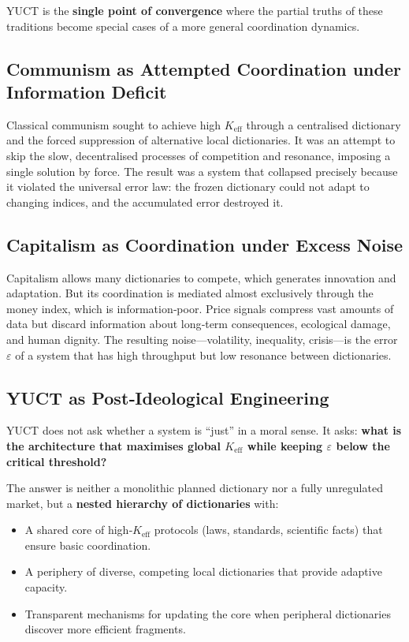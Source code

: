 \documentclass[12pt,a4paper]{article}
\newcommand{\Keff}{K_{\mathrm{eff}}}
\begin{document}
	YUCT is the \textbf{single point of convergence} where the partial truths of these traditions become special cases of a more general coordination dynamics.
	
	\subsection{Communism as Attempted Coordination under Information Deficit}
	
	Classical communism sought to achieve high \(\Keff\) through a centralised dictionary and the forced suppression of alternative local dictionaries. It was an attempt to skip the slow, decentralised processes of competition and resonance, imposing a single solution by force. The result was a system that collapsed precisely because it violated the universal error law: the frozen dictionary could not adapt to changing indices, and the accumulated error destroyed it.
	
	\subsection{Capitalism as Coordination under Excess Noise}
	
	Capitalism allows many dictionaries to compete, which generates innovation and adaptation. But its coordination is mediated almost exclusively through the money index, which is information‑poor. Price signals compress vast amounts of data but discard information about long‑term consequences, ecological damage, and human dignity. The resulting noise—volatility, inequality, crisis—is the error \(\varepsilon\) of a system that has high throughput but low resonance between dictionaries.
	
	\subsection{YUCT as Post‑Ideological Engineering}
	
	YUCT does not ask whether a system is ``just'' in a moral sense. It asks: \textbf{what is the architecture that maximises global \(K_{\mathrm{eff}}\) while keeping \(\varepsilon\) below the critical threshold?}
	
	The answer is neither a monolithic planned dictionary nor a fully unregulated market, but a \textbf{nested hierarchy of dictionaries} with:
	\begin{itemize}[leftmargin=*]
		\item A shared core of high‑\(\Keff\) protocols (laws, standards, scientific facts) that ensure basic coordination.
		\item A periphery of diverse, competing local dictionaries that provide adaptive capacity.
		\item Transparent mechanisms for updating the core when peripheral dictionaries discover more efficient fragments.
	\end{itemize}
	
\end{document}
